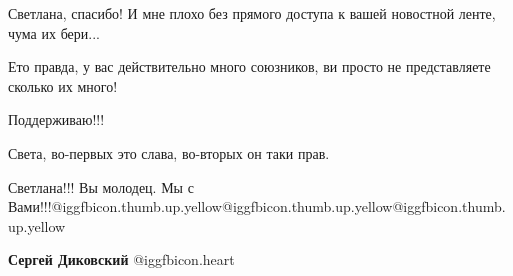 \begin{itemize}
 
Светлана, спасибо! И мне плохо без прямого доступа к вашей новостной ленте, чума их бери...

 
Ето правда, у вас действительно много союзников, ви просто не представляете сколько их много!

 
Поддерживаю!!!

 
Света, во-первых это слава, во-вторых он таки прав.

 
Светлана!!! Вы молодец.
Мы с Вами!!!@igg{fbicon.thumb.up.yellow}@igg{fbicon.thumb.up.yellow}@igg{fbicon.thumb.up.yellow}


\begin{itemize}
 
\textbf{Сергей Диковский} @igg{fbicon.heart}
\end{itemize}

 

\end{itemize}

